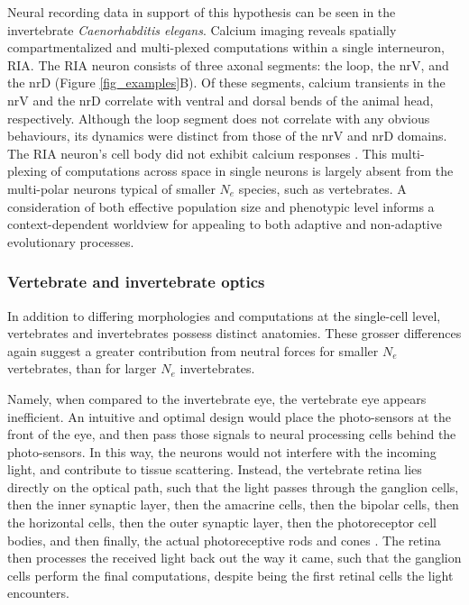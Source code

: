 \documentclass[twocolumn]{article}
\begin{document}
Neural recording data in support of this hypothesis can be seen in the invertebrate \textit{Caenorhabditis  elegans}. Calcium imaging reveals spatially compartmentalized and multi-plexed computations within a single interneuron, RIA. The RIA neuron consists of three axonal segments: the loop, the nrV, and the nrD (Figure \ref{fig_examples}B). Of these segments, calcium transients in the nrV and the nrD correlate with ventral and dorsal bends of the animal head, respectively. Although the loop segment does not correlate with any obvious behaviours, its dynamics were distinct from those of the nrV and nrD domains. The RIA neuron's cell body did not exhibit calcium responses \cite{Hendricks_Ha_Maffey_Zhang_2012}. This multi-plexing of computations across space in single neurons is largely absent from the multi-polar neurons typical of smaller $N_e$ species, such as vertebrates. A consideration of both effective population size and phenotypic level informs a context-dependent worldview for appealing to both adaptive and non-adaptive evolutionary processes. 

\subsubsection{Vertebrate and invertebrate optics} 
In addition to differing morphologies and computations at the single-cell level, vertebrates and invertebrates possess distinct anatomies. These grosser differences again suggest a greater contribution from neutral forces for smaller $N_e$ vertebrates, than for larger $N_e$ invertebrates. 

Namely, when compared to the invertebrate eye, the vertebrate eye appears inefficient. An intuitive and optimal design would place the photo-sensors at the front of the eye, and then pass those signals to neural processing cells behind the photo-sensors. In this way, the neurons would not interfere with the incoming light, and contribute to tissue scattering. Instead, the vertebrate retina lies directly on the optical path, such that the light passes through the ganglion cells, then the inner synaptic layer, then the amacrine cells, then the bipolar cells, then the horizontal cells, then the outer synaptic layer, then the photoreceptor cell bodies, and then finally, the actual photoreceptive rods and cones \cite{sterling_laughlin_principles, land_nilsson_2012}. The retina then processes the received light back out the way it came, such that the ganglion cells perform the final computations, despite being the first retinal cells the light encounters. 
\end{document}
